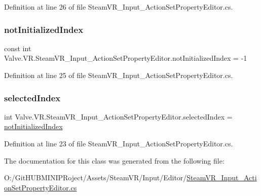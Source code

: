 Definition at line 26 of file Steam\+V\+R\+\_\+\+Input\+\_\+\+Action\+Set\+Property\+Editor.\+cs.

\mbox{\label{class_valve_1_1_v_r_1_1_steam_v_r___input___action_set_property_editor_a2be8e8b2504b572a5d00cfd4ba31da8b}} 
\subsubsection{\texorpdfstring{notInitializedIndex}{notInitializedIndex}}
{\footnotesize\ttfamily const int Valve.\+V\+R.\+Steam\+V\+R\+\_\+\+Input\+\_\+\+Action\+Set\+Property\+Editor.\+not\+Initialized\+Index = -\/1\hspace{0.3cm}{\ttfamily [protected]}}



Definition at line 25 of file Steam\+V\+R\+\_\+\+Input\+\_\+\+Action\+Set\+Property\+Editor.\+cs.

\mbox{\label{class_valve_1_1_v_r_1_1_steam_v_r___input___action_set_property_editor_a44b8bf1bb0f63149daa3ab7c4b6850e1}} 
\subsubsection{\texorpdfstring{selectedIndex}{selectedIndex}}
{\footnotesize\ttfamily int Valve.\+V\+R.\+Steam\+V\+R\+\_\+\+Input\+\_\+\+Action\+Set\+Property\+Editor.\+selected\+Index = \mbox{\hyperlink{class_valve_1_1_v_r_1_1_steam_v_r___input___action_set_property_editor_a2be8e8b2504b572a5d00cfd4ba31da8b}{not\+Initialized\+Index}}}



Definition at line 23 of file Steam\+V\+R\+\_\+\+Input\+\_\+\+Action\+Set\+Property\+Editor.\+cs.



The documentation for this class was generated from the following file\+:\begin{DoxyCompactItemize}
\item 
O\+:/\+Git\+H\+U\+B\+M\+I\+N\+I\+P\+Roject/\+Assets/\+Steam\+V\+R/\+Input/\+Editor/\mbox{\hyperlink{_steam_v_r___input___action_set_property_editor_8cs}{Steam\+V\+R\+\_\+\+Input\+\_\+\+Action\+Set\+Property\+Editor.\+cs}}\end{DoxyCompactItemize}
